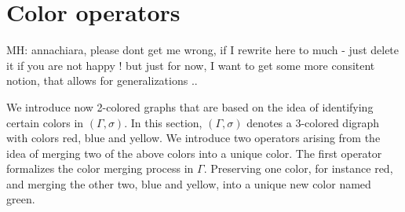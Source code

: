 \documentclass[final,3p,times]{elsarticle}
\newcommand{\TODO}[1]{\begingroup\color{red}#1\endgroup}
\newcommand{\OLD}[1]{\begingroup\tiny\color{gray}#1\endgroup}
\newcommand{\mh}[1]{\begingroup\color{magenta}#1\endgroup}
\begin{document}
\section{Color operators}
\label{sec:operators}
\TODO{MH: annachiara, please dont get me wrong, if I rewrite here to much - just delete it if you are not 
happy ! but just for now, I want to get some more consitent notion, that allows for generalizations .. }


\mh{
We introduce now 2-colored graphs that are based on the idea of identifying certain colors in  $(\Gamma,\sigma)$.
}
\OLD{In this section, $(\Gamma,\sigma)$ denotes a 3-colored digraph with colors red, blue and yellow. 
We introduce two operators arising from the idea of merging two of the above colors into a unique color. The first operator formalizes the color merging process in $\Gamma$. Preserving one color, for instance red, and merging the other two, blue and yellow, into a unique new color named green.}
\end{document}
